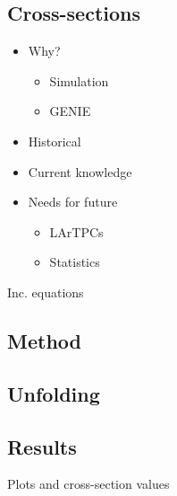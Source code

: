 \subsection{Cross-sections}
    \begin{itemize}

        \item Why?
        
        \begin{itemize}

            \item Simulation
            \item GENIE

        \end{itemize}
        
        \item Historical
        \item Current knowledge
        \item Needs for future
        
        \begin{itemize}

            \item LArTPCs
            \item Statistics

        \end{itemize}

    \end{itemize}

Inc. equations
\subsection{Method}
\subsection{Unfolding}
\subsection{Results}
Plots and cross-section values

\clearpage
